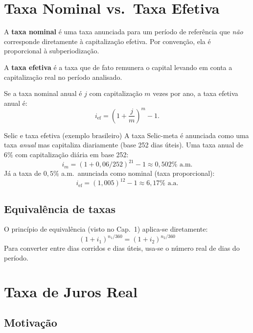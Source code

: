 \section{Taxa Nominal vs.\ Taxa Efetiva}

\begin{definicao}
A \textbf{taxa nominal} é uma taxa anunciada para um período de referência que \emph{não}
corresponde diretamente à capitalização efetiva. Por convenção, ela é proporcional à
subperiodização.

A \textbf{taxa efetiva} é a taxa que de fato remunera o capital levando em conta a capitalização
real no período analisado.
\end{definicao}

Se a taxa nominal anual é $j$ com capitalização $m$ vezes por ano, a taxa efetiva anual é:
\[
  i_{\text{ef}} = \left(1 + \frac{j}{m}\right)^m - 1.
\]

\begin{exemplo}{Selic e taxa efetiva (exemplo brasileiro)}
A taxa Selic-meta é anunciada como uma taxa \emph{anual} mas capitaliza diariamente
(base 252 dias úteis). Uma taxa anual de $6\%$ com capitalização diária em base 252:
\[
  i_m = (1 + 0{,}06/252)^{21} - 1 \approx 0{,}502\% \text{ a.m.}
\]
Já a taxa de $0{,}5\%$ a.m.\ anunciada como nominal (taxa proporcional):
\[
  i_{\text{ef}} = (1{,}005)^{12} - 1 \approx 6{,}17\% \text{ a.a.}
\]
\end{exemplo}

\subsection{Equivalência de taxas}

O princípio de equivalência (visto no Cap.~1) aplica-se diretamente:
\[
  (1 + i_1)^{n_1/360} = (1 + i_2)^{n_2/360}
\]
Para converter entre dias corridos e dias úteis, usa-se o número real de dias do período.

\section{Taxa de Juros Real}

\subsection{Motivação}

